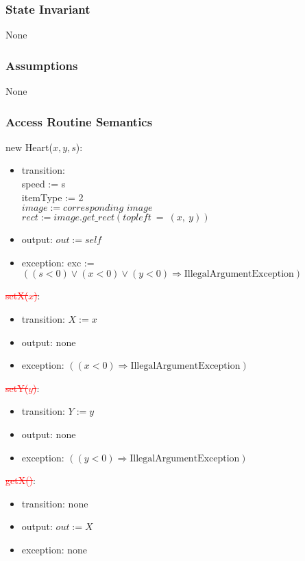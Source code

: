 \documentclass[12pt]{article}
\begin{document}
\subsubsection*{State Invariant}
None
\subsubsection*{Assumptions}
None
\subsubsection*{Access Routine Semantics}
\noindent new Heart($\mathit{x}, \mathit{y}, \mathit{s}$):
\begin{itemize}
\item transition: \\ speed := s\\ itemType := 2\\$image := \textit{corresponding image}$\\
 $rect := image.get\_rect(topleft\ =\ (x,\ y))$
\item output: $out := \mathit{self}$
\item exception: exc := $((\mathit{s} < 0) \vee (\mathit{x} < 0) \vee 
  (\mathit{y} < 0) \Rightarrow \text{IllegalArgumentException})$
\end{itemize}

\noindent \textcolor{red}{\st{setX($\mathit{x}$)}}:
\begin{itemize}
\item transition: $X := x$ 
\item output: none
\item exception: $((\mathit{x} < 0) \Rightarrow \text{IllegalArgumentException})$
\end{itemize}

\noindent \textcolor{red}{\st{setY($\mathit{y}$)}}:
\begin{itemize}
\item transition: $Y := y$ 
\item output: none
\item exception: $((\mathit{y} < 0) \Rightarrow \text{IllegalArgumentException})$
\end{itemize}

\noindent \textcolor{red}{\st{getX()}}:
\begin{itemize}
\item transition: none
\item output: $out := X$
\item exception: none
\end{itemize}
\end{document}
